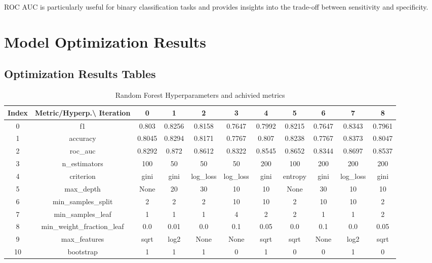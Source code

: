\documentclass{article}%
\begin{document}
                ROC AUC is particularly useful for binary classification tasks and provides insights into the trade-off between sensitivity and specificity.
                

%
\newpage%
\section{Model Optimization Results}%
\label{sec:ModelOptimizationResults}%
\subsection{Optimization Results Tables}%
\label{subsec:OptimizationResultsTables}%


\begin{table}[h!]%
\caption{Random Forest Hyperparameters and achivied metrics}%
\vspace{0.2cm}%
\centering%
\begin{tabular}{|c||c||c||c||c||c||c||c||c||c||c|}%
\hline%
Index&Metric/Hyperp.\textbackslash{} Iteration&0&1&2&3&4&5&6&7&8\\%
\hline%
0&f1&0.803&0.8256&0.8158&0.7647&0.7992&0.8215&0.7647&0.8343&0.7961\\%
1&accuracy&0.8045&0.8294&0.8171&0.7767&0.807&0.8238&0.7767&0.8373&0.8047\\%
2&roc\_auc&0.8292&0.872&0.8612&0.8322&0.8545&0.8652&0.8344&0.8697&0.8537\\%
3&n\_estimators&100&50&50&50&200&100&200&200&200\\%
4&criterion&gini&gini&log\_loss&log\_loss&gini&entropy&gini&log\_loss&gini\\%
5&max\_depth&None&20&30&10&10&None&30&10&10\\%
6&min\_samples\_split&2&2&2&10&10&2&10&10&2\\%
7&min\_samples\_leaf&1&1&1&4&2&2&1&1&2\\%
8&min\_weight\_fraction\_leaf&0.0&0.01&0.0&0.1&0.05&0.0&0.1&0.0&0.05\\%
9&max\_features&sqrt&log2&None&None&sqrt&sqrt&None&log2&sqrt\\%
10&bootstrap&1&1&1&0&1&0&0&1&0\\%
\hline%
\end{tabular}%
\end{table}

%
\end{document}
